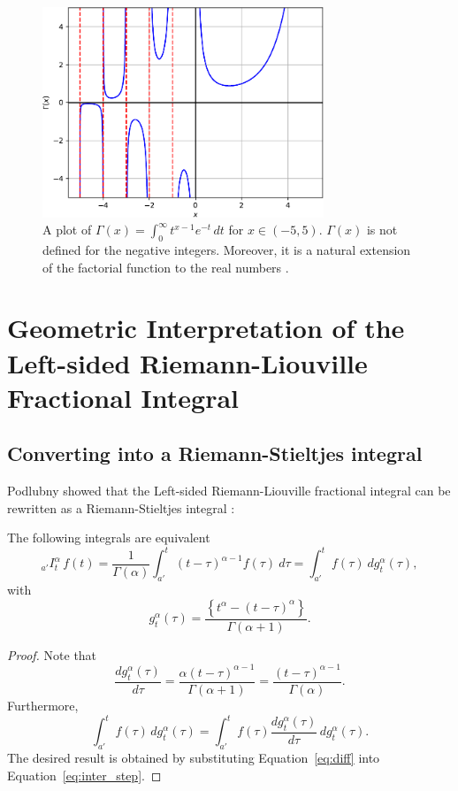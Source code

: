 \documentclass[twoside,reqno,11pt]{fcaa-var} %
\begin{document}
\begin{figure}[htb]
\centering
\includegraphics[width=0.75\textwidth]{gamma.pdf}
\caption{A plot of $\Gamma(x) = \int_0^{\infty} t^{x-1} e^{-t}\,dt$ for $x\in(-5,5)$. $\Gamma(x)$ is not defined for the negative integers. Moreover, it is a natural extension of the factorial function to the real numbers \cite{euler1738}.}
\label{fig:gamma}
\end{figure}

\section{Geometric Interpretation of the Left-sided Riemann-Liouville Fractional Integral}

\subsection{Converting into a Riemann-Stieltjes integral}
Podlubny showed that the Left-sided Riemann-Liouville fractional integral can be rewritten as a Riemann-Stieltjes integral \cite{podlubny02}:
\begin{theorem}
The following integrals are equivalent
\begin{equation}
_{a'}I_t^{\alpha}\,f(t) = \frac{1}{\Gamma(\alpha)}\int_{a'}^{t}(t-\tau)^{\alpha-1}f(\tau)~d\tau = \int_{a'}^{t} f(\tau)~dg_t^{\alpha}(\tau), 
\end{equation}
with 
\begin{equation}
\label{eq:g_rl}
g_t^{\alpha}(\tau) = \frac{\left \{t^{\alpha} - (t-\tau)^{\alpha} \right \}}{\Gamma(\alpha+1)}. 
\end{equation}
\end{theorem}

\begin{proof}
Note that 
\begin{equation}
\label{eq:diff}
\frac{dg_t^{\alpha}(\tau)}{d\tau} = \frac{\alpha(t-\tau)^{\alpha-1}}{\Gamma(\alpha+1)} =\frac{(t-\tau)^{\alpha-1}}{\Gamma(\alpha)}. 
\end{equation}
Furthermore,
\begin{equation}
\label{eq:inter_step}
\int_{a'}^{t} f(\tau)\,dg_t^{\alpha}(\tau) = \int_{a'}^{t} f(\tau) \frac{dg_t^{\alpha}(\tau)}{d\tau}\,dg_t^{\alpha}(\tau). 
\end{equation}
The desired result is obtained by substituting Equation~\eqref{eq:diff} into Equation~\eqref{eq:inter_step}.  
\end{proof}
\end{document}
